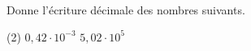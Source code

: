 %
%
    Donne l'écriture décimale des nombres suivants.
    \begin{tasks}(2)
        \task $0,42 \cdot 10^{-3}$
        \task $5,02 \cdot 10^{5}$
    \end{tasks}
